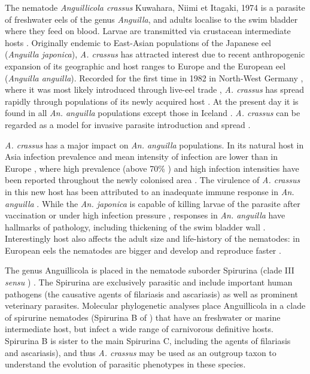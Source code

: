 \documentclass[10pt]{bmc_article}
\newenvironment{bmcformat}{\begin{raggedright}\baselineskip20pt\sloppy\setboolean{publ}{false}}{\end{raggedright}\baselineskip20pt\sloppy}
\begin{document}
\begin{bmcformat}
The nematode \textit{Anguillicola crassus} Kuwahara, Niimi et Itagaki,
1974 \cite{kuwahara_Niimi_Itagaki_1974} is a parasite of freshwater
eels of the genus \textit{Anguilla}, and adults localise to the swim
bladder where they feed on blood. Larvae are transmitted via
crustacean intermediate hosts
\cite{de_charleroy_life_1990}. Originally endemic to East-Asian
populations of the Japanese eel (\textit{Anguilla japonica}),
\textit{A. crassus} has attracted interest due to recent anthropogenic
expansion of its geographic and host ranges to Europe and the European
eel (\textit{Anguilla anguilla}). Recorded for the first time in 1982
in North-West Germany \cite{fischer_teichwirt}, where it was most
likely introduced through live-eel trade
\cite{koops_anguillicola-infestations_1989, koie_swimbladder_1991},
\textit{A. crassus} has spread rapidly through populations of its
newly acquired host \cite{kirk_impact_2003}. At the present day it is
found in all \textit{An. anguilla} populations except those in Iceland
\cite{kristmundsson_parasite_2007}. \textit{A. crassus} can be
regarded as a model for invasive parasite introduction and spread
\cite{taraschewski_hosts_2007}.

\textit{A. crassus} has a major impact on \textit{An. anguilla}
populations. In its natural host in Asia infection prevalence and mean
intensity of infection are lower than in Europe
\cite{mnderle_occurrence_2006}, where high prevalence (above 70\%
\cite{wrtz_distribution_1998}) and high infection intensities have been
reported throughout the newly colonised area
\cite{lefebvre_anguillicolosis:_2004}. The virulence of
\textit{A. crassus} in this new host has been attributed to an
inadequate immune response in \textit{An. anguilla}
\cite{knopf_swimbladder_2006}. While the \textit{An. japonica} is
capable of killing larvae of the parasite after vaccination
\cite{knopf_vaccination_2008} or under high infection pressure
\cite{heitlinger_massive_2009}, responses in \textit{An. anguilla}
have hallmarks of pathology, including thickening of the swim bladder
wall \cite{wurtz_tara_2000}.  Interestingly host also affects the
adult size and life-history of the nematodes: in European eels the
nematodes are bigger and develop and reproduce faster
\cite{knopf_differences_2004}.

The genus Anguillicola is placed in the nematode suborder Spirurina
(clade III \textit{sensu} \cite{blaxter_molecular_1998})
\cite{nadler_molecular_2007, wijov_evolutionary_2006}. The Spirurina
are exclusively parasitic and include important human pathogens (the
causative agents of filariasis and ascariasis) as well as prominent
veterinary parasites. Molecular phylogenetic analyses place
Anguillicola in a clade of spirurine nematodes (Spirurina B of
\cite{dl_py}) that have an freshwater or marine intermediate host, but
infect a wide range of carnivorous definitive hosts. Spirurina B is
sister to the main Spirurina C, including the agents of filariasis and
ascariasis), and thus \textit{A. crassus} may be used as an outgroup
taxon to understand the evolution of parasitic phenotypes in these
species.


\end{bmcformat}
\end{document}
